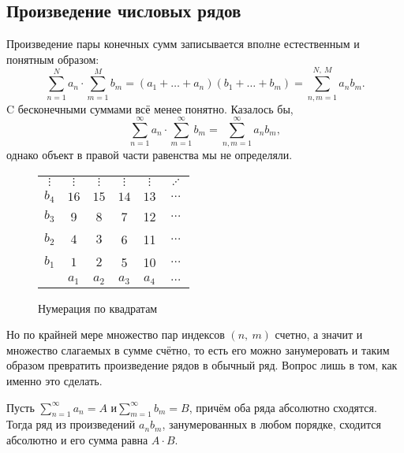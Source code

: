 \subsection{Произведение числовых рядов}
	Произведение пары конечных сумм записывается вполне естественным и понятным образом:
	\[
	\sum\limits_{n=1}^{N}a_n \cdot \sum\limits_{m=1}^{M}b_m = (a_1 + \dots + a_n) (b_1 + \dots + b_m)=\sum\limits_{n,m=1}^{N,\  M}a_nb_m.
	\]
	C бесконечными суммами всё менее понятно. Казалось бы,
	\[
	\sum\limits_{n=1}^{\infty}a_n \cdot \sum\limits_{m=1}^{\infty}b_m = \sum\limits_{n, m=1}^{\infty}a_nb_m,
	\] однако объект в правой части равенства мы не определяли.

	\medskip
	
	\begin{wrapfigure}{l}{0.3\linewidth}
		\begin{tabular}[t]{c|ccccc}
			$\vdots$ & $\vdots$ & $\vdots$ & $\vdots$ &$\vdots$& $\iddots$ \\
			$b_4$ & $16$ & $15$ & $14$ & $13$ &$\dots$\\
			$b_3$ & 9 & 8 & 7 &  12&$\dots$ \\
			$b_2$ & $4$ & $3$ & 6 & 11&$\dots$ \\
			$b_1$ & $1$ & $2$ & 5 & 10& $\dots $\\
			\hline
			& $a_1$ & $a_2$ & $a_3$ & $a_4$ &$\dots$ 
		\end{tabular}
		\caption{Нумерация по квадратам}
		\vspace{-50pt}
	\end{wrapfigure}
	Но по крайней мере множество пар индексов $(n,\ m)$ счетно, а значит и множество слагаемых в сумме счётно, то есть его можно занумеровать и таким образом превратить произведение рядов в обычный ряд. Вопрос лишь в том, как именно это сделать.
	
	\begin{Theorem}
		Пусть $\sum\limits_{n=1}^{\infty}a_n =A $ и$ \sum\limits_{m=1}^{\infty}b_m = B$, причём оба ряда абсолютно сходятся. Тогда ряд из произведений $a_nb_m$, занумерованных в любом порядке, сходится абсолютно и его сумма равна $A\cdot B$.
	\end{Theorem} 
	
